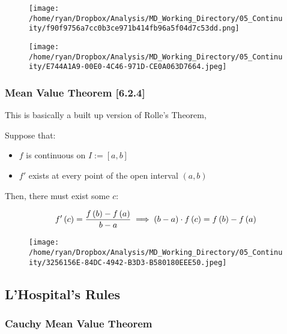 \documentclass[
]{article}
\begin{document}
\begin{figure}
\centering
\texttt{[image: /home/ryan/Dropbox/Analysis/MD\_Working\_Directory/05\_Continuity/f90f9756a7cc0b3ce971b414fb96a5f04d7c53dd.png]}
\caption{}
\end{figure}

\begin{figure}
\centering
\texttt{[image: /home/ryan/Dropbox/Analysis/MD\_Working\_Directory/05\_Continuity/E744A1A9-00E0-4C46-971D-CE0A063D7664.jpeg]}
\caption{}
\end{figure}

\hypertarget{header-n4032}{%
\subsubsection{Mean Value Theorem {[}6.2.4{]} }\label{header-n4032}}

This is basically a built up version of Rolle's Theorem,

Suppose that:

\begin{itemize}
\item
  \(f\) is continuous on \(I:= [a,b]\)
\item
  \(f'\) exists at every point of the open interval \((a,b)\)
\end{itemize}

Then, there must exist some \(c\):

\[f'\left( c \right) = \frac{f\left( b \right)-f\left( a \right)}{b-a} \\
\implies  \left( b-a \right) \cdot f\left( c \right) = f\left( b \right) - f\left( a \right)\]

\begin{figure}
\centering
\texttt{[image: /home/ryan/Dropbox/Analysis/MD\_Working\_Directory/05\_Continuity/3256156E-84DC-4942-B3D3-B580180EEE50.jpeg]}
\caption{}
\end{figure}

\newpage
\hypertarget{header-n4043}{%
\subsection{L'Hospital's Rules}\label{header-n4043}}

\hypertarget{header-n4044}{%
\subsubsection{Cauchy Mean Value Theorem}\label{header-n4044}}
\end{document}
